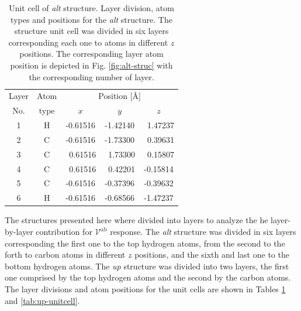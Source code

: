 \documentclass[prb,11pt,tightenlines,twocolumn,aps]{revtex4-1}
\begin{document}
\begin{table}[tb]
\center
\begin{tabular}{ccccc}\\
\hline
Layer & Atom & \multicolumn{3}{c}{Position [\AA]} \\
\cline{3-5}
No. & type & $x$ & $y$ & $z$  \\
\hline
1 & H &  -0.61516 &  -1.42140 & \ 1.47237 \\
2 & C &  -0.61516 &  -1.73300 & \ 0.39631 \\
3 & C & \ 0.61516 & \ 1.73300 & \ 0.15807 \\
4 & C & \ 0.61516 & \ 0.42201 &  -0.15814 \\
5 & C &  -0.61516 &  -0.37396 &  -0.39632 \\
6 & H &  -0.61516 &  -0.68566 &  -1.47237 \\
\hline
\end{tabular}
\caption{Unit cell of \emph{alt} structure. Layer division, atom types and
positions for the \emph{alt} structure. The structure unit cell was divided in
six layers corresponding each one to atoms in different $z$ positions. The
corresponding layer atom position is depicted in Fig. \ref{fig:alt-struc} with
the corresponding number of layer.}
\label{tab:alt-unitcell}
\end{table}

The structures presented here where divided into layers to analyze the he
layer-by-layer contribution for $\mathcal{V}^{\mathrm{ab}}$ response. The
\emph{alt} structure was divided in six layers corresponding the first one to
the top hydrogen atoms, from the second to the forth to carbon atoms in
different $z$ positions, and the sixth and last one to the bottom hydrogen
atoms. The \emph{up} structure was divided into two layers, the first one
comprised by the top hydrogen atoms and the second by the carbon atoms. The
layer divisions and atom positions for the unit cells are shown in Tables
\ref{tab:alt-unitcell} and \ref{tab:up-unitcell}.
\end{document}
